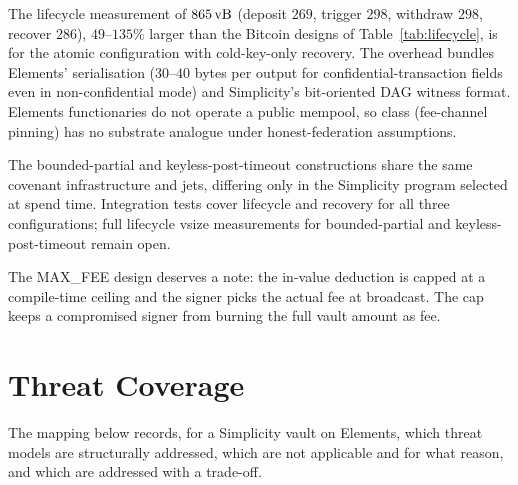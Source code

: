 The lifecycle measurement of $865\,\text{vB}{}$ (deposit $269$, trigger $298$,
withdraw $298$, recover $286$), $49$--$135\%$ larger than the Bitcoin
designs of Table~\ref{tab:lifecycle}, is for the atomic configuration
with cold-key-only recovery. The overhead bundles Elements'
serialisation ($30$--$40$ bytes per output for confidential-transaction
fields even in non-confidential mode) and Simplicity's bit-oriented
DAG witness format. Elements functionaries do not operate a public
mempool, so class \classfee{} (fee-channel pinning) has no substrate
analogue under honest-federation assumptions.

The bounded-partial and keyless-post-timeout constructions share the
same covenant infrastructure and jets, differing only in the Simplicity
program selected at spend time. Integration tests cover lifecycle and
recovery for all three configurations; full lifecycle vsize
measurements for bounded-partial and keyless-post-timeout remain open.

The MAX\_FEE design deserves a note: the in-value deduction is capped
at a compile-time ceiling and the signer picks the actual fee at
broadcast. The cap keeps a compromised signer from burning the full
vault amount as fee.

\section{Threat Coverage}
\label{app:simplicity:threats}

The mapping below records, for a Simplicity vault on Elements, which
threat models are structurally addressed, which are not applicable
and for what reason, and which are addressed with a trade-off.

